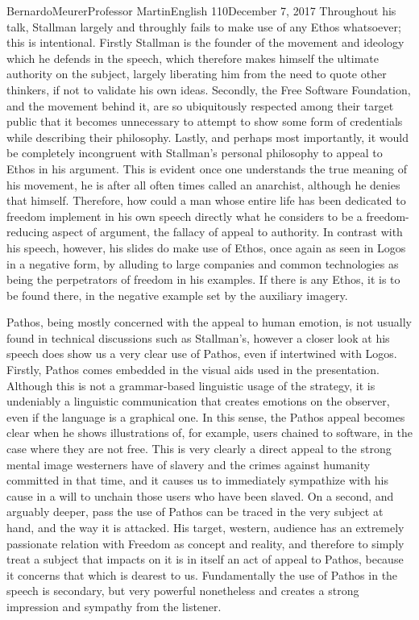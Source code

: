 \documentclass[12pt,letterpaper]{article}
\begin{document}
\begin{mla}{Bernardo}{Meurer}{Professor Martin}{English 110}{December 7, 2017}
        Throughout his talk, Stallman largely and throughly fails to make use of any Ethos whatsoever; this is intentional. Firstly Stallman is the founder of the movement and ideology which he defends in the speech, which therefore makes himself the ultimate authority on the subject, largely liberating him from the need to quote other thinkers, if not to validate his own ideas. Secondly, the Free Software Foundation, and the movement behind it, are so ubiquitously respected among their target public that it becomes unnecessary to attempt to show some form of credentials while describing their philosophy. Lastly, and perhaps most importantly, it would be completely incongruent with Stallman's personal philosophy to appeal to Ethos in his argument. This is evident once one understands the true meaning of his movement, he is after all often times called an anarchist, although he denies that himself. Therefore, how could a man whose entire life has been dedicated to freedom implement in his own speech directly what he considers to be a freedom-reducing aspect of argument, the fallacy of appeal to authority. In contrast with his speech, however, his slides do make use of Ethos, once again as seen in Logos in a negative form, by alluding to large companies and common technologies as being the perpetrators of freedom in his examples. If there is any Ethos, it is to be found there, in the negative example set by the auxiliary imagery.

        Pathos, being mostly concerned with the appeal to human emotion, is not usually found in technical discussions such as Stallman's, however a closer look at his speech does show us a very clear use of Pathos, even if intertwined with Logos. Firstly, Pathos comes embedded in the visual aids used in the presentation. Although this is not a grammar-based linguistic usage of the strategy, it is undeniably a linguistic communication that creates emotions on the observer, even if the language is a graphical one. In this sense, the Pathos appeal becomes clear when he shows illustrations of, for example, users chained to software, in the case where they are not free. This is very clearly a direct appeal to the strong mental image westerners have of slavery and the crimes against humanity committed in that time, and it causes us to immediately sympathize with his cause in a will to unchain those users who have been slaved. On a second, and arguably deeper, pass the use of Pathos can be traced in the very subject at hand, and the way it is attacked. His target, western, audience has an extremely passionate relation with Freedom as concept and reality, and therefore to simply treat a subject that impacts on it is in itself an act of appeal to Pathos, because it concerns that which is dearest to us. Fundamentally the use of Pathos in the speech is secondary, but very powerful nonetheless and creates a strong impression and sympathy from the listener.


\end{mla}
\end{document}
